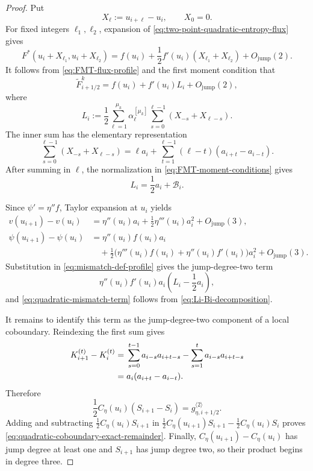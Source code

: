 \documentclass[11pt]{amsart}
\theoremstyle{plain}
\theoremstyle{definition}
\theoremstyle{remark}
\numberwithin{equation}{section}
\theoremstyle{plain}
\begin{document}
\begin{proof}
	Put
	\[
	X_\ell:=u_{i+\ell}-u_i,
	\qquad X_0=0.
	\]
	For fixed integers $\ell_1,\ell_2$, expansion of
	\eqref{eq:two-point-quadratic-entropy-flux} gives
	\[
	F^*(u_i+X_{\ell_1},u_i+X_{\ell_2})
	=f(u_i)+\frac12f'(u_i)(X_{\ell_1}+X_{\ell_2})
	+O_{\mathrm{jump}}(2).
	\]
	It follows from \eqref{eq:FMT-flux-profile} and the first moment condition
	that
	\begin{equation}\label{eq:FMT-linear-expansion}
		\widetilde F^k_{i+1/2}
		=f(u_i)+f'(u_i)L_i+O_{\mathrm{jump}}(2),
	\end{equation}
	where
	\[
	L_i
	:=\frac12\sum_{\ell=1}^{\mu_k}
	\alpha_\ell^{[\mu_k]}
	\sum_{s=0}^{\ell-1}(X_{-s}+X_{\ell-s}).
	\]
	The inner sum has the elementary representation
	\begin{equation}\label{eq:X-sum-jump-representation}
		\sum_{s=0}^{\ell-1}(X_{-s}+X_{\ell-s})
		=\ell a_i
		+\sum_{t=1}^{\ell-1}
		(\ell-t)(a_{i+t}-a_{i-t}).
	\end{equation}
	After summing in $\ell$, the normalization in
	\eqref{eq:FMT-moment-conditions} gives
	\begin{equation}\label{eq:Li-Bi-decomposition}
		L_i=\frac12a_i+\mathcal B_i.
	\end{equation}
	
	Since $\psi'=\eta''f$, Taylor expansion at $u_i$ yields
	\begin{align*}
		v(u_{i+1})-v(u_i)
		&={}
		\eta''(u_i)a_i
		+\frac12\eta'''(u_i)a_i^2
		+O_{\mathrm{jump}}(3),\\
		\psi(u_{i+1})-\psi(u_i)
		&={}
		\eta''(u_i)f(u_i)a_i\\
		&\quad
		+\frac12
		\bigl(\eta'''(u_i)f(u_i)
		+\eta''(u_i)f'(u_i)\bigr)a_i^2
		+O_{\mathrm{jump}}(3).
	\end{align*}
	Substitution in \eqref{eq:mismatch-def-profile} gives the jump-degree-two
	term
	\[
	\eta''(u_i)f'(u_i)a_i
	\left(L_i-\frac12a_i\right),
	\]
	and \eqref{eq:quadratic-mismatch-term} follows from
	\eqref{eq:Li-Bi-decomposition}.
	
	It remains to identify this term as the jump-degree-two component of a
	local coboundary.  Reindexing the first sum gives
	\begin{align}
		K_{i+1}^{(t)}-K_i^{(t)}
		&={}
		\sum_{s=0}^{t-1}a_{i-s}a_{i+t-s}
		-\sum_{s=1}^{t}a_{i-s}a_{i+t-s}
		\notag\\
		&=a_i(a_{i+t}-a_{i-t}).
		\label{eq:K-telescoping-identity}
	\end{align}
	Therefore
	\[
	\frac12C_\eta(u_i)(S_{i+1}-S_i)
	=g_{\eta,i+1/2}^{\langle2\rangle}.
	\]
	Adding and subtracting
	$\frac12C_\eta(u_i)S_{i+1}$ in
	$\frac12C_\eta(u_{i+1})S_{i+1}
	-\frac12C_\eta(u_i)S_i$
	proves \eqref{eq:quadratic-coboundary-exact-remainder}.  Finally,
	$C_\eta(u_{i+1})-C_\eta(u_i)$ has jump degree at least one and $S_{i+1}$
	has jump degree two, so their product begins in degree three.
\end{proof}
\end{document}
